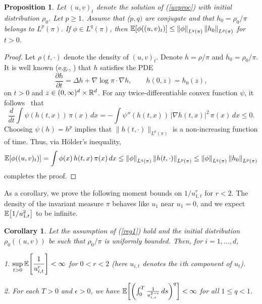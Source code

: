 \documentclass[11pt, twoside]{report}
\newtheorem{corollary}[theorem]{Corollary}
\newtheorem{proposition}[theorem]{Proposition}
\begin{document}
\begin{proposition}\label{l1}Let $(u,v)_t$ denote the solution of (\ref{uvproc}) with initial distribution $\rho_0$. Let $p\geq 1$. Assume that ($p,q)$ are conjugate and that  $h_0=\rho_0/\pi$ belongs to $L^p(\pi)$. If $\phi \in L^q(\pi)$, then $\mean{ \phi((u,v)_t)}\le \norm{\phi}_{L^q(\pi)}\, \norm{h_0}_{L^p(\pi)}$ for $t>0$.
\end{proposition}
%
\begin{proof} Let $\rho(t,\cdot)$ denote the density of $(u,v)_t$. Denote $h=\rho/\pi$ and $h_0=\rho_0/\pi$. It is well known (e.g., \cite{Markowich2004-dw}) that $h$ satisfies the PDE
\[
\frac{\partial h}{\partial t}=\Delta h + \nabla \log \pi\cdot \nabla h,\qquad h(0,z)=h_0(z),
\]
on $t>0$ and $z\in(0,\infty)^d\times \mathbb{R}^d$. For any twice-differentiable convex function $\psi$, it follows~\cite[Eq.~9]{Markowich2004-dw}   that
\[
\frac{d}{dt} \int \psi(h(t,x))\, \pi(x)\,dx=-\int \psi''(h(t,x))\,|\nabla h(t,x)|^2\,\pi(x)\,dx\le 0.\]
Choosing $\psi(h)=h^p$ implies that $\|h(t,\cdot)\|_{L^p(\pi)}$ is a non-increasing function of time.
Thus, via H\"{o}lder's inequality,
 \begin{align*}
     \mean{\phi((u,v)_t)}
 =\int \phi(x)\,h(t,x)\, \pi(x)\, dx
 \le \norm{\phi}_{L^{q}(\pi)} \, \norm{h(t,\cdot)}_{L^p(\pi)} \le \norm{\phi}_{L^{q}(\pi)} \, \norm{h_0}_{L^p(\pi)}
 \end{align*}
 completes the proof.
\end{proof}
As a corollary, we prove the following moment bounds on $1/u_{1,t}^r$ for $r<2$. The density of the invariant measure $\pi$ behaves like $u_1$ near $u_1=0$, and we expect $\mathbb{E}\bp{1/u_{1,t}^2}$ to be infinite. 
\begin{corollary}\label{cor} Let the assumption of (\ref{reg1}) hold and the initial distribution $\rho_0((u,v))$ be such that $\rho_0/\pi$ is uniformly bounded.
Then, for $i=1,\dots,d$,

1. $\displaystyle\sup_{t>0}\mathbb{E} \bp{\frac 1{u_{i,t}^r}}<\infty$ for $0<r<2$ (here $u_{i,t}$ denotes the $i$th component of $u_t$).\vspace{1ex}

2. For each $T>0$ and $\epsilon>0$, we have
 $\mean{\pp{\int_0^T \frac{1}{u_{i,s}^{2-\epsilon}}\,ds}^q} <\infty $ for all $1 \le q < 1$.
  
\end{corollary}
\end{document}
